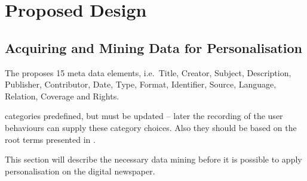 \chapter{Proposed Design} %
\label{ch:design}

\section{Acquiring and Mining Data for Personalisation}

The \cite{DCMI} proposes 15 meta data elements, i.e.\ Title, Creator, Subject, Description, Publisher, Contributor, Date, Type, Format, Identifier, Source, Language, Relation, Coverage and Rights.

categories predefined, but must be updated -- later the recording of the user behaviours can supply these category choices. Also they should be based on the root terms presented in \cite{10-1-1-19-5583}.

This section will describe the necessary data mining before it is possible to apply personalisation on the digital newspaper.
\begin{quotation}
\end{quotation}

